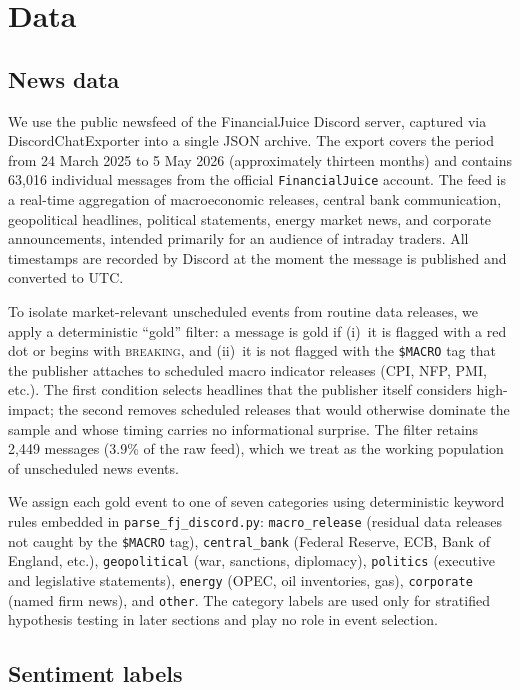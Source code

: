 \section{Data}
\label{sec:data}

\subsection{News data}
\label{ssec:news-data}

We use the public newsfeed of the FinancialJuice Discord server,
captured via DiscordChatExporter into a single JSON archive. The
export covers the period from 24 March 2025 to 5 May 2026
(approximately thirteen months) and contains 63{,}016 individual
messages from the official \texttt{FinancialJuice} account. The feed
is a real-time aggregation of macroeconomic releases, central bank
communication, geopolitical headlines, political statements, energy
market news, and corporate announcements, intended primarily for an
audience of intraday traders. All timestamps are recorded by Discord
at the moment the message is published and converted to UTC.

To isolate market-relevant unscheduled events from routine data
releases, we apply a deterministic ``gold'' filter: a message is
gold if (i)~it is flagged with a red dot or begins with
\textsc{breaking}, and (ii)~it is not flagged with the
\texttt{\$MACRO} tag that the publisher attaches to scheduled macro
indicator releases (CPI, NFP, PMI, etc.). The first condition selects
headlines that the publisher itself considers high-impact; the second
removes scheduled releases that would otherwise dominate the sample
and whose timing carries no informational surprise. The filter
retains 2{,}449 messages (3.9\% of the raw feed), which we treat as
the working population of unscheduled news events.

We assign each gold event to one of seven categories using
deterministic keyword rules embedded in
\texttt{parse\_fj\_discord.py}: \texttt{macro\_release} (residual
data releases not caught by the \texttt{\$MACRO} tag),
\texttt{central\_bank} (Federal Reserve, ECB, Bank of England, etc.),
\texttt{geopolitical} (war, sanctions, diplomacy), \texttt{politics}
(executive and legislative statements), \texttt{energy} (OPEC, oil
inventories, gas), \texttt{corporate} (named firm news), and
\texttt{other}. The category labels are used only for stratified
hypothesis testing in later sections and play no role in event
selection.

\subsection{Sentiment labels}
\label{ssec:sentiment-labels}

